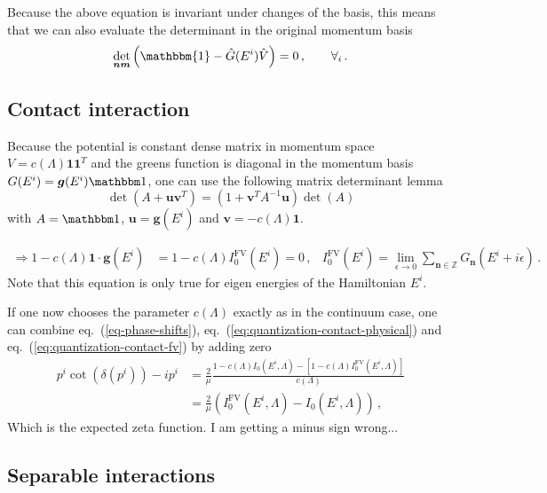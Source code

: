 \documentclass[
    aps,
    prl,
    showkeys,
    nofootinbib,
    floatfix
]{revtex4}
\renewcommand{\vec}[1]{\boldsymbol{#1}}
\begin{document}
Because the above equation is invariant under changes of the basis, this means that we can also evaluate the determinant in the original momentum basis
\begin{equation}
	\det\limits_{\vec n \vec m} \left({\mathbbm{1}} - \hat G( E^i ) \hat V\right) = 0 \, , \qquad \forall_i \, .
\end{equation}


\subsection{Contact interaction}

Because the potential is constant dense matrix in momentum space $V = c(\Lambda) \vec 1 \vec 1^T$ and the greens function is diagonal in the momentum basis  $G(E^i) = \vec g(E^i) \mathbbm 1$, one can use the following matrix determinant lemma
\begin{equation}\label{eq-det-sum-lemma}
	\det\left({A}+ \vec u \vec v^T\right)=\left(1+\vec{v}^{T} {A}^{-1} \vec{u}\right) \det({A})
\end{equation}
with $A = \mathbbm 1$, $\vec u = \vec g(E^i)$ and $\vec v = - c(\Lambda) \vec 1$.

\begin{align}\label{eq:quantization-contact-fv}
	\Rightarrow
	1 - c(\Lambda) \vec 1 \cdot \vec g(E^i) &= 1 - c(\Lambda) I_0^{\mathrm{FV}}(E^i) = 0 \, , &
	I_0^{\mathrm{FV}}(E^i) = \lim\limits_{\epsilon \to 0}\sum\limits_{\vec n \in \mathbb Z} G_{\vec n}(E^i + i \epsilon) \, .
\end{align}
Note that this equation is only true for eigen energies of the Hamiltonian $E^i$.

If one now chooses the parameter $c(\Lambda)$ exactly as in the continuum case, one can combine eq.~(\ref{eq-phase-shifts}), eq.~(\ref{eq:quantization-contact-physical}) and eq.~(\ref{eq:quantization-contact-fv}) by adding zero
\begin{align}
	p^i \cot(\delta(p^i)) -i p^i 
	&= 
	\frac{2}{\mu} \frac{1 - c(\Lambda) I_0(E^i, \Lambda) - \left[ 1 - c(\Lambda) I_0^{\mathrm{FV}}(E^i, \Lambda) \right]}{c(\Lambda)}
	\\ &=
	\frac{2}{\mu} \left( I_0^{\mathrm{FV}}(E^i, \Lambda) - I_0(E^i, \Lambda)\right)
	\, ,
\end{align}
Which is the expected zeta function.
{\color{red} I am getting a minus sign wrong...}


\subsection{Separable interactions}
\end{document}
